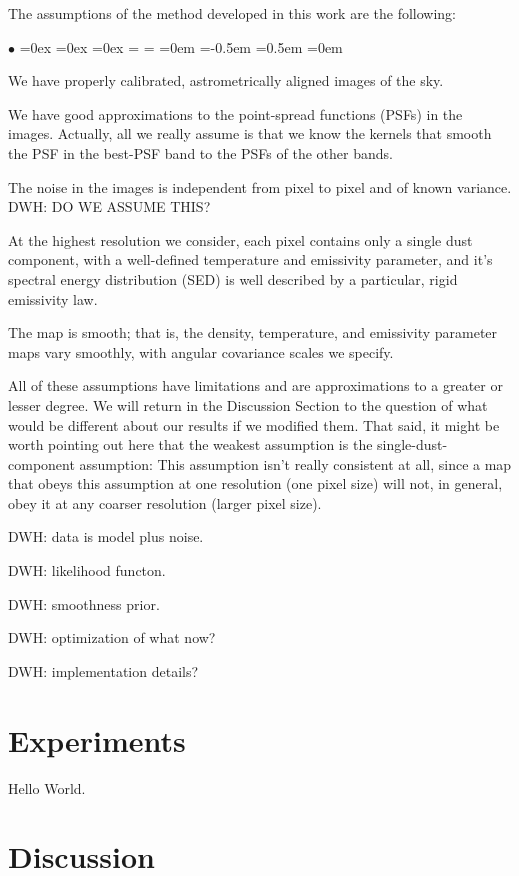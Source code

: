 \documentclass[12pt, preprint]{aastex}
\newenvironment{hoggitemize}{\begin{list}{$\bullet$}{%
\topsep=0ex
\partopsep=0ex
\itemsep=0.5\parskip
\parsep=0ex
\leftmargin=\parindent
\rightmargin=\parindent
\listparindent=0em
\itemindent=-0.5em
\labelsep=0.5em
\labelwidth=0em}}{\end{list}}
\begin{document}
The assumptions of the method developed in this work are the
following:
\begin{hoggitemize}
\item We have properly calibrated, astrometrically aligned images of
  the sky.
\item We have good approximations to the point-spread functions (PSFs)
  in the images.  Actually, all we really assume is that we know the
  kernels that smooth the PSF in the best-PSF band to the PSFs of the
  other bands.
\item The noise in the images is independent from pixel to pixel and
  of known variance. DWH: DO WE ASSUME THIS?
\item At the highest resolution we consider, each pixel contains only
  a single dust component, with a well-defined temperature and
  emissivity parameter, and it's spectral energy distribution (SED)
  is well described by a particular, rigid emissivity law.
\item The map is smooth; that is, the density, temperature, and
  emissivity parameter maps vary smoothly, with angular covariance
  scales we specify.
\end{hoggitemize}
All of these assumptions have limitations and are approximations to a
greater or lesser degree.
We will return in the Discussion Section to the question of what would
be different about our results if we modified them.
That said, it might be worth pointing out here that the weakest
assumption is the single-dust-component assumption:
This assumption isn't really consistent at all, since a map that obeys
this assumption at one resolution (one pixel size) will not, in
general, obey it at any coarser resolution (larger pixel size).

DWH: data is model plus noise.

DWH: likelihood functon.

DWH: smoothness prior.

DWH: optimization of what now?

DWH: implementation details?

\section{Experiments}

Hello World.

\section{Discussion}
\end{document}
